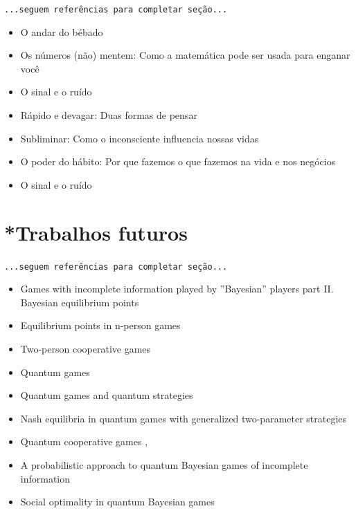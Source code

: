 \documentclass[
	article,			        %
	11pt,				          %
	oneside,			        %
	a4paper,			        %
	english,			        %
	brazil,				        %
	sumario=tradicional
]{abntex2}\usepackage[]{graphicx}\usepackage[]{color}
\begin{document}
  \texttt{\color{red}...seguem referências para completar seção...}
  \begin{itemize}
    \item O andar do bébado \cite{Mlodinow.2009}
    \item Os n\'umeros (não) mentem: Como a matemática pode ser usada para enganar você \cite{Seife.2012}
    \item O sinal e o ruído \cite{Nate.2012}
    \item R{á}pido e devagar: Duas formas de pensar \cite{Kahneman.2012}
    \item Subliminar: Como o inconsciente influencia nossas vidas \cite{Mlodinow.2013}
    \item O poder do h{á}bito: Por que fazemos o que fazemos na vida e nos neg{ó}cios \cite{Duhigg.2012}
    \item O sinal e o ruído \cite{Nate.2012}
  \end{itemize}

\section{*Trabalhos futuros}

  \texttt{\color{red}...seguem referências para completar seção...}
  \begin{itemize}
    \item Games with incomplete information played by ''Bayesian'' players part II. Bayesian equilibrium points \cite{Harsanyi.1968}
    \item Equilibrium points in n-person games \cite{Nash.1950}
    \item Two-person cooperative games \cite{Nash.1953}
    \item Quantum games \cite{JoseFigueiredo.2004}
    \item Quantum games and quantum strategies \cite{Eisert.1999}
    \item Nash equilibria in quantum games with generalized two-parameter strategies \cite{Flitney.2007}
    \item Quantum cooperative games \cite{Iqbal.2002},\cite{Dai.2004}
    \item A probabilistic approach to quantum Bayesian games of incomplete information \cite{Iqbal.2014}
    \item Social optimality in quantum Bayesian games \cite{Azhar.2015}
  \end{itemize}

\postextual





\end{document}
